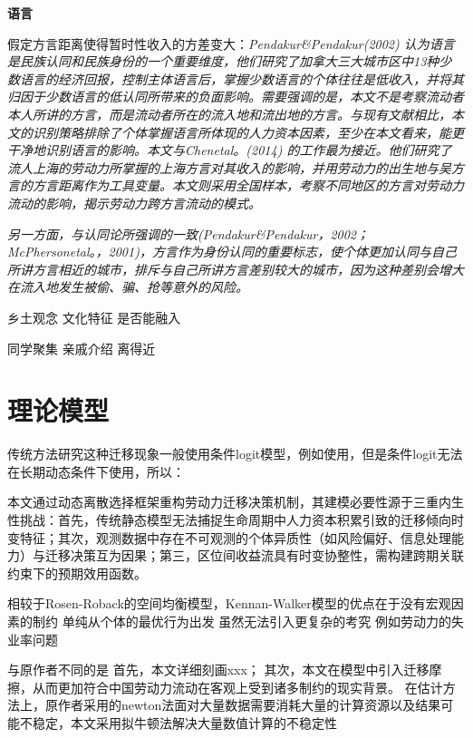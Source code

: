 \documentclass[a4paper,12pt,oneside]{book} %
\begin{document}
\textbf{语言}

\cite{LiuYuYunLaoDongLiKuaFangYanLiuDongDeDaoUXingMoShi2015}假定方言距离使得暂时性收入的方差变大：\textit{Pendakur\&Pendakur(2002) 认为语言是民族认同和民族身份的一个重要维度，他们研究了加拿大三大城市区中13种少数语言的经济回报，控制主体语言后，掌握少数语言的个体往往是低收入，并将其归因于少数语言的低认同所带来的负面影响。需要强调的是，本文不是考察流动者本人所讲的方言，而是流动者所在的流入地和流出地的方言。与现有文献相比，本文的识别策略排除了个体掌握语言所体现的人力资本因素，至少在本文看来，能更干净地识别语言的影响。本文与Chenetal。(2014) 的工作最为接近。他们研究了流人上海的劳动力所掌握的上海方言对其收入的影响，并用劳动力的出生地与吴方言的方言距离作为工具变量。本文则采用全国样本，考察不同地区的方言对劳动力流动的影响，揭示劳动力跨方言流动的模式。}

\textit{另一方面，与认同论所强调的一致(Pendakur\&Pendakur，2002；McPhersonetal。，2001)，方言作为身份认同的重要标志，使个体更加认同与自己所讲方言相近的城市，排斥与自己所讲方言差别较大的城市，因为这种差别会增大在流入地发生被偷、骗、抢等意外的风险。}









乡土观念
文化特征
是否能融入

同学聚集
亲戚介绍
离得近


\chapter{理论模型}
传统方法研究这种迁移现象一般使用条件logit模型，例如\cite{SunWeiZengKongQiWuRanYuLaoDongLiDeKongJianLiuDongJiYuLiuDongRenKouJiuYeXuanZhiXingWeiDeYanJiu2019}使用，但是条件logit无法在长期动态条件下使用，所以：

本文通过动态离散选择框架重构劳动力迁移决策机制，其建模必要性源于三重内生性挑战：首先，传统静态模型无法捕捉生命周期中人力资本积累引致的迁移倾向时变特征；其次，观测数据中存在不可观测的个体异质性（如风险偏好、信息处理能力）与迁移决策互为因果；第三，区位间收益流具有时变协整性，需构建跨期关联约束下的预期效用函数。

相较于Rosen-Roback的空间均衡模型，Kennan-Walker模型的优点在于没有宏观因素的制约
单纯从个体的最优行为出发
虽然无法引入更复杂的考究 例如劳动力的失业率问题

与原作者不同的是
首先，本文详细刻画xxx；
其次，本文在模型中引入迁移摩擦，从而更加符合中国劳动力流动在客观上受到诸多制约的现实背景。
在估计方法上，原作者采用的newton法面对大量数据需要消耗大量的计算资源以及结果可能不稳定，本文采用拟牛顿法解决大量数值计算的不稳定性
\end{document}
